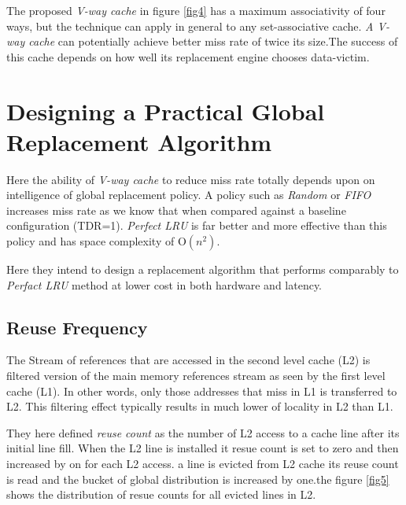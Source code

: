 \documentclass{report}
\begin{document}
\vspace{.8cm}
The proposed \emph{V-way cache} in figure \ref{fig4} has a maximum associativity of four ways, but the technique can apply in general to any set-associative cache.
\emph{A V-way cache} can potentially achieve better miss rate of twice its size.The success of this cache depends on how well its replacement engine chooses data-victim.

\vspace{3cm}
\section{ Designing a Practical Global Replacement Algorithm}

Here the ability of \emph{V-way cache} to reduce miss rate totally depends upon on intelligence of global replacement policy.  A policy such as  \emph{Random }or  \emph{FIFO} increases miss rate as we know that when compared against a baseline configuration (TDR=1).  \emph{Perfect LRU} is far better and more effective than this policy and has space complexity of O$(n^2)$.

\vspace{.8cm}
Here they intend to design a replacement algorithm that performs comparably to \emph{Perfact LRU} method at lower cost in both hardware and latency.

\subsection{Reuse Frequency}

The Stream of references that are accessed in the second level cache (L2) is filtered version of the main memory references stream as seen by the first level cache (L1). In other words, only those addresses that miss in L1 is transferred to L2. This filtering effect typically results in much lower of locality in L2 than L1.

They here defined \emph{reuse count} as the number of L2 access to a cache line after its initial line fill.
When the L2 line is installed it resue count is set to zero and then increased by on for each L2 access.
a line is evicted from L2 cache its reuse count is read and the bucket of global distribution is increased by one.the figure \ref{fig5} shows the distribution of resue counts for all evicted lines in L2.
\end{document}
